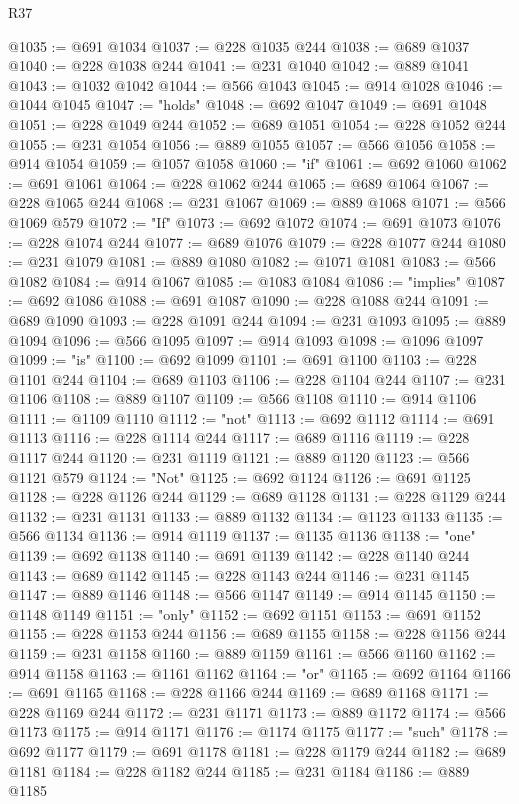 \begin{lexlean}{R37}
\begin{coremodule}
@1035 := @691 @1034
@1037 := @228 @1035 @244
@1038 := @689 @1037
@1040 := @228 @1038 @244
@1041 := @231 @1040
@1042 := @889 @1041
@1043 := @1032 @1042
@1044 := @566 @1043
@1045 := @914 @1028
@1046 := @1044 @1045
@1047 := "holds"
@1048 := @692 @1047
@1049 := @691 @1048
@1051 := @228 @1049 @244
@1052 := @689 @1051
@1054 := @228 @1052 @244
@1055 := @231 @1054
@1056 := @889 @1055
@1057 := @566 @1056
@1058 := @914 @1054
@1059 := @1057 @1058
@1060 := "if"
@1061 := @692 @1060
@1062 := @691 @1061
@1064 := @228 @1062 @244
@1065 := @689 @1064
@1067 := @228 @1065 @244
@1068 := @231 @1067
@1069 := @889 @1068
@1071 := @566 @1069 @579
@1072 := "If"
@1073 := @692 @1072
@1074 := @691 @1073
@1076 := @228 @1074 @244
@1077 := @689 @1076
@1079 := @228 @1077 @244
@1080 := @231 @1079
@1081 := @889 @1080
@1082 := @1071 @1081
@1083 := @566 @1082
@1084 := @914 @1067
@1085 := @1083 @1084
@1086 := "implies"
@1087 := @692 @1086
@1088 := @691 @1087
@1090 := @228 @1088 @244
@1091 := @689 @1090
@1093 := @228 @1091 @244
@1094 := @231 @1093
@1095 := @889 @1094
@1096 := @566 @1095
@1097 := @914 @1093
@1098 := @1096 @1097
@1099 := "is"
@1100 := @692 @1099
@1101 := @691 @1100
@1103 := @228 @1101 @244
@1104 := @689 @1103
@1106 := @228 @1104 @244
@1107 := @231 @1106
@1108 := @889 @1107
@1109 := @566 @1108
@1110 := @914 @1106
@1111 := @1109 @1110
@1112 := "not"
@1113 := @692 @1112
@1114 := @691 @1113
@1116 := @228 @1114 @244
@1117 := @689 @1116
@1119 := @228 @1117 @244
@1120 := @231 @1119
@1121 := @889 @1120
@1123 := @566 @1121 @579
@1124 := "Not"
@1125 := @692 @1124
@1126 := @691 @1125
@1128 := @228 @1126 @244
@1129 := @689 @1128
@1131 := @228 @1129 @244
@1132 := @231 @1131
@1133 := @889 @1132
@1134 := @1123 @1133
@1135 := @566 @1134
@1136 := @914 @1119
@1137 := @1135 @1136
@1138 := "one"
@1139 := @692 @1138
@1140 := @691 @1139
@1142 := @228 @1140 @244
@1143 := @689 @1142
@1145 := @228 @1143 @244
@1146 := @231 @1145
@1147 := @889 @1146
@1148 := @566 @1147
@1149 := @914 @1145
@1150 := @1148 @1149
@1151 := "only"
@1152 := @692 @1151
@1153 := @691 @1152
@1155 := @228 @1153 @244
@1156 := @689 @1155
@1158 := @228 @1156 @244
@1159 := @231 @1158
@1160 := @889 @1159
@1161 := @566 @1160
@1162 := @914 @1158
@1163 := @1161 @1162
@1164 := "or"
@1165 := @692 @1164
@1166 := @691 @1165
@1168 := @228 @1166 @244
@1169 := @689 @1168
@1171 := @228 @1169 @244
@1172 := @231 @1171
@1173 := @889 @1172
@1174 := @566 @1173
@1175 := @914 @1171
@1176 := @1174 @1175
@1177 := "such"
@1178 := @692 @1177
@1179 := @691 @1178
@1181 := @228 @1179 @244
@1182 := @689 @1181
@1184 := @228 @1182 @244
@1185 := @231 @1184
@1186 := @889 @1185

\end{coremodule}
\end{lexlean}
